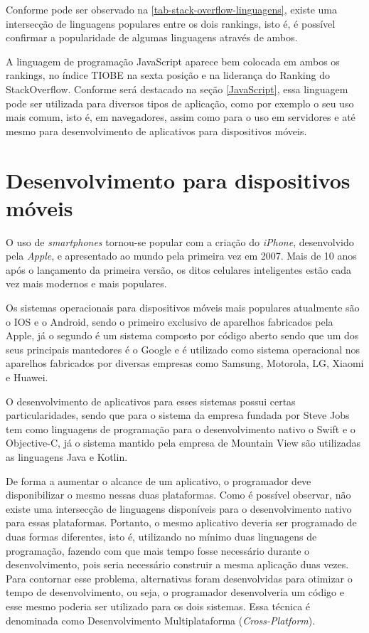 \newpage
Conforme pode ser observado na \autoref{tab-stack-overflow-linguagens}, existe uma intersecção de linguagens populares entre os dois rankings, isto é, é possível confirmar a popularidade de algumas linguagens através de ambos.

A linguagem de programação JavaScript aparece bem colocada em ambos os rankings, no índice TIOBE\cite{tiobeDefinition} na sexta posição e na liderança do Ranking do StackOverflow\cite{stackOverflowRanking}. Conforme será destacado na seção \ref{JavaScript}, essa linguagem pode ser utilizada para diversos tipos de aplicação, como por exemplo o seu uso mais comum, isto é, em navegadores, assim como para o uso em servidores e até mesmo para desenvolvimento de aplicativos para dispositivos móveis.

\section{Desenvolvimento para dispositivos móveis}
\label{sec-desenvolvimento-apps}

O uso de \textit{smartphones} tornou-se popular com a criação do \textit{iPhone}, desenvolvido pela \textit{Apple}, e apresentado ao mundo pela primeira vez em 2007. Mais de 10 anos após o lançamento da primeira versão, os ditos celulares inteligentes estão cada vez mais modernos e mais populares.\cite{iphoneApple}


Os sistemas operacionais para dispositivos móveis mais populares atualmente são o IOS e o Android, sendo o primeiro exclusivo de aparelhos fabricados pela Apple, já o segundo é um sistema composto por código aberto sendo que um dos seus principais mantedores é o Google e é utilizado como sistema operacional nos aparelhos fabricados por diversas empresas como Samsung, Motorola, LG, Xiaomi e Huawei.

O desenvolvimento de aplicativos para esses sistemas possui certas particularidades, sendo que para o sistema da empresa fundada por Steve Jobs tem como linguagens de programação para o desenvolvimento nativo o Swift e o Objective-C, já o sistema mantido pela empresa de Mountain View são utilizadas as linguagens Java e Kotlin.

De forma a aumentar o alcance de um aplicativo, o programador deve disponibilizar o mesmo nessas duas plataformas. Como é possível observar, não existe uma intersecção de linguagens disponíveis para o desenvolvimento nativo para essas plataformas. Portanto, o mesmo aplicativo deveria ser programado de duas formas diferentes, isto é, utilizando no mínimo duas linguagens de programação, fazendo com que mais tempo fosse necessário durante o desenvolvimento, pois seria necessário construir a mesma aplicação duas vezes. Para contornar esse problema, alternativas foram desenvolvidas para otimizar o tempo de desenvolvimento, ou seja, o programador desenvolveria um código e esse mesmo poderia ser utilizado para os dois sistemas. Essa técnica é denominada como Desenvolvimento Multiplataforma (\textit{Cross-Platform}).\cite{desenvolvimentoMobile}


